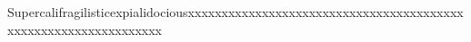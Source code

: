 \documentclass[a4paper]{article}
\begin{document}
Supercalifragilisticexpialidociousxxxxxxxxxxxxxxxxxxxxxxxxxxxxxxxxxxxxxxxxxxxxxxxxxxxxxxxxxxxxxxxx
\end{document}
